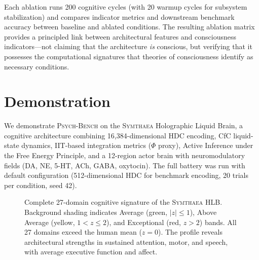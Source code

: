 \documentclass[11pt,letterpaper]{article}
\newcommand{\symthaea}{\textsc{Symthaea}}
\newcommand{\psychbench}{\textsc{Psych-Bench}}
\newcommand{\hlb}{\textsc{HLB}}
\begin{document}
Each ablation runs 200 cognitive cycles (with 20 warmup cycles for subsystem stabilization) and compares indicator metrics and downstream benchmark accuracy between baseline and ablated conditions. The resulting ablation matrix provides a principled link between architectural features and consciousness indicators---not claiming that the architecture \emph{is} conscious, but verifying that it possesses the computational signatures that theories of consciousness identify as necessary conditions.

\section{Demonstration}
\label{sec:demonstration}

We demonstrate \psychbench{} on the \symthaea{} Holographic Liquid Brain, a cognitive architecture combining 16,384-dimensional HDC encoding, CfC liquid-state dynamics, IIT-based integration metrics ($\Phi$ proxy), Active Inference under the Free Energy Principle, and a 12-region actor brain with neuromodulatory fields (DA, NE, 5-HT, ACh, GABA, oxytocin). The full battery was run with default configuration (512-dimensional HDC for benchmark encoding, 20 trials per condition, seed 42).

\begin{figure}[t]
\centering
{}\alldomains
{}
\caption{Complete 27-domain cognitive signature of the \symthaea{} \hlb{}. Background shading indicates Average (green, $|z| \leq 1$), Above Average (yellow, $1 < z \leq 2$), and Exceptional (red, $z > 2$) bands. All 27 domains exceed the human mean ($z = 0$). The profile reveals architectural strengths in sustained attention, motor, and speech, with average executive function and affect.}
\label{fig:signature}
\end{figure}
\end{document}
